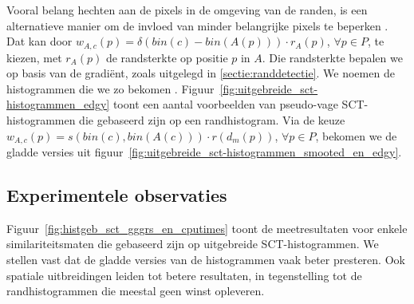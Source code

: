 Vooral belang hechten aan de pixels in de omgeving van de randen, is een alternatieve
manier om de invloed van minder belangrijke pixels te beperken 
\cite{vertan:upgrading_color_distribution_for_ir}. Dat kan door 
$w_{A,c}(p)=\delta(bin(c)-bin(A(p))) \cdot r_{A}(p)$, $\forall p \in P$, te kiezen, met $r_{A}(p)$ de randsterkte op positie $p$ in $A$.
Die randsterkte bepalen we op basis van de gradi\"ent, zoals uitgelegd in \ref{sectie:randdetectie}.  
We noemen de histogrammen die we zo bekomen . 
Figuur~\ref{fig:uitgebreide_sct-histogrammen_edgy} toont een aantal voorbeelden van
pseudo-vage SCT-histogrammen die gebaseerd zijn op een randhistogram.
Via de keuze $w_{A,c}(p)=s(bin(c),bin(A(c))) \cdot r(d_m(p))$, $\forall p \in P$, 
bekomen we de gladde versies uit
figuur~\ref{fig:uitgebreide_sct-histogrammen_smooted_en_edgy}. 



\subsection{Experimentele observaties}

Figuur~\ref{fig:histgeb_sct_gggrs_en_cputimes} toont de meetresultaten voor enkele
similariteitsmaten die gebaseerd zijn op uitgebreide SCT-histogrammen. We stellen
vast dat de gladde versies van de histogrammen vaak beter presteren. Ook spatiale 
uitbreidingen leiden tot betere resultaten, in tegenstelling tot de randhistogrammen
die meestal geen winst opleveren.

